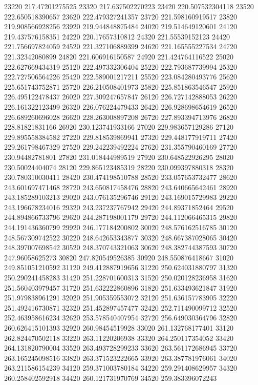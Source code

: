 {23220 217.47201275525
23320 217.637502270223
23420 220.507532304118
23520 222.650518390657
23620 222.479327241357
23720 221.598160919517
23820 219.908566928256
23920 219.944848875484
24020 219.514649120601
24120 219.437576158351
24220 220.17657310812
24320 221.55539152123
24420 221.756697824059
24520 221.327106889399
24620 221.165555227534
24720 221.32342080899
24820 221.606916150587
24920 221.424764116522
25020 222.627669434319
25120 222.497332306404
25220 222.793687739994
25320 222.727506564226
25420 222.589001217211
25520 223.084280493776
25620 225.651743752871
25720 226.210508401973
25820 225.851863546547
25920 226.495122478437
26020 227.309247657847
26120 226.727142888053
26220 226.161322123499
26320 226.076224479433
26420 226.928698654619
26520 226.689260696028
26620 228.263008897208
26720 227.893394713976
26820 228.81821831166
26920 230.123741933166
27020 229.983657129286
27120 229.895558384582
27220 229.818539869941
27320 229.448177919711
27420 229.261798467329
27520 229.242239492224
27620 231.355790460169
27720 230.94482781801
27820 231.018444989519
27920 230.648522926295
28020 230.50024404074
28120 229.865123485319
28220 230.099397880318
28320 230.780310030411
28420 230.474198510788
28520 233.057653732477
28620 243.601697471468
28720 243.650817458476
28820 243.640665642461
28920 243.185289103213
29020 243.076135296746
29120 243.169015729983
29220 243.196678234016
29320 243.237237767942
29420 244.89371852464
29520 244.894866733796
29620 244.287198001179
29720 244.112066465315
29820 244.191436360799
29920 246.177184200802
30020 248.576162516785
30120 248.567309742522
30220 248.642653343877
30320 248.667387028065
30420 248.397007698542
30520 248.370743321063
30620 248.382744387593
30720 247.96058625273
30820 247.820549526385
30920 248.550876418667
31020 249.851051210592
31120 249.412887919656
31220 250.624031880797
31320 250.290241458283
31420 251.228701600313
31520 250.020128236958
31620 251.560403979457
31720 251.632222860896
31820 251.633493621847
31920 251.979838961291
32020 251.905359553072
32120 251.636157783905
32220 251.492416730871
32320 251.452897457477
32420 252.711490099712
32520 252.463958616234
32620 253.578540407954
32720 256.649030364796
32820 260.626415101393
32920 260.98454519928
33020 261.132768177401
33120 262.824470502118
33220 263.11220206938
33320 264.250117354052
33420 264.131820790004
33520 263.493728299233
33620 263.561172686945
33720 263.165245098516
33820 263.371523222665
33920 263.387781976061
34020 263.211586154239
34120 259.371003780184
34220 259.291408629957
34320 260.258402592918
34420 260.121731970769
34520 259.383396072243
}
